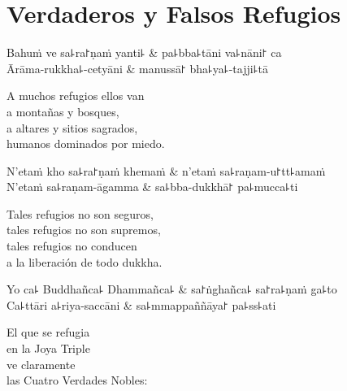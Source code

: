 \chapter{Verdaderos y Falsos Refugios}


\begin{leader}
\end{leader}

\begin{twochants}
  Bahuṁ ve sa꜕ra꜓ṇaṁ yanti꜕ & pa꜕bba꜕tāni va꜕nāni꜓ ca \\
  Ārāma-rukkha꜕-cetyāni & manussā꜓ bha꜕ya꜕-tajji꜕tā \\
\end{twochants}

\begin{english}
  A muchos refugios ellos van\\
  a montañas y bosques,\\
  a altares y sitios sagrados,\\
  humanos dominados por miedo.
\end{english}

\begin{twochants}
  N'etaṁ kho sa꜕ra꜓ṇaṁ khemaṁ & n'etaṁ sa꜕raṇam-u꜓tt꜕amaṁ \\
  N'etaṁ sa꜕raṇam-āgamma & sa꜕bba-dukkhā꜓ pa꜕mucca꜕ti \\
\end{twochants}

\begin{english}
  Tales refugios no son seguros,\\
  tales refugios no son supremos,\\
  tales refugios no conducen\\
  a la liberación de todo dukkha.
\end{english}

\begin{twochants}
  Yo ca꜕ Buddhañca꜕ Dhammañca꜕ & sa꜓ṅghañca꜕ sa꜓ra꜕ṇaṁ ga꜕to \\
  Ca꜕ttāri a꜕riya-saccāni & sa꜕mmappaññāya꜓ pa꜕ss꜕ati \\
\end{twochants}

\begin{english}
  El que se refugia\\
  en la Joya Triple\\
  ve claramente\\
  las Cuatro Verdades Nobles:
\end{english}

